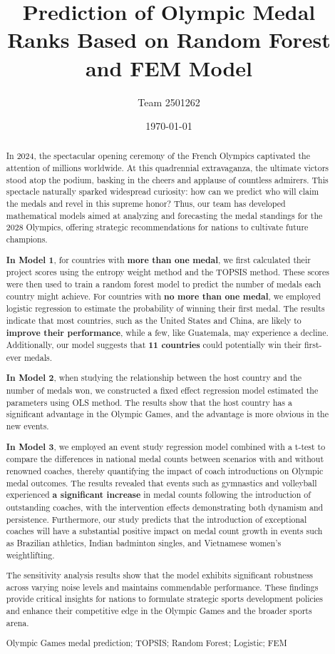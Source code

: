 \documentclass{mcmthesis}  %
\title{Prediction of Olympic Medal Ranks Based on Random Forest and FEM Model}  %
\author{\small Team 2501262}  %
\date{\today}  %
\begin{document}
\begin{abstract}  %
\hspace*{1.5em}In 2024, the spectacular opening ceremony of the French Olympics captivated the attention of millions worldwide. At this quadrennial extravaganza, the ultimate victors stood atop the podium, basking in the cheers and applause of countless admirers. This spectacle naturally sparked widespread curiosity: how can we predict who will claim the medals and revel in this supreme honor? Thus, our team has developed mathematical models aimed at analyzing and forecasting the medal standings for the 2028 Olympics, offering strategic  recommendations for nations to cultivate future champions.

\textbf{In Model 1}, for countries with \textbf{more than one medal}, we first calculated their project scores using the entropy weight method and the TOPSIS method. These scores were then used to train a random forest model to predict the number of medals each country might achieve. For countries with\textbf{ no more than one medal}, we employed logistic regression to estimate the probability of winning their first medal. The results indicate that most countries, such as the United States and China, are likely to \textbf{improve their performance}, while a few, like Guatemala, may experience a decline. Additionally, our model suggests that \textbf{11 countries} could potentially win their first-ever medals.

\textbf{In Model 2}, when studying the relationship between the host country and the number of medals won, we constructed a fixed effect regression model estimated the parameters using OLS method. The results show that the host country has a significant advantage in the Olympic Games, and the advantage is more obvious in the new events.

\textbf{In Model 3}, we employed an event study regression model combined with a t-test to compare the differences in national medal counts between scenarios with and without renowned coaches, thereby quantifying the impact of coach introductions on Olympic medal outcomes. The results revealed that events such as gymnastics and volleyball experienced \textbf{a significant increase} in medal counts following the introduction of outstanding coaches, with the intervention effects demonstrating both dynamism and persistence. Furthermore, our study predicts that the introduction of exceptional coaches will have a substantial positive impact on medal count growth in events such as Brazilian athletics, Indian badminton singles, and Vietnamese women's weightlifting.

The sensitivity analysis results show that the model exhibits significant robustness across varying noise levels and maintains commendable performance. These findings provide critical insights for nations to formulate strategic sports development policies and enhance their competitive edge in the Olympic Games and the broader sports arena.
\begin{keywords}  %
Olympic Games medal prediction; TOPSIS; Random Forest; Logistic; FEM
\end{keywords}  %
\end{abstract}  %
\end{document}
